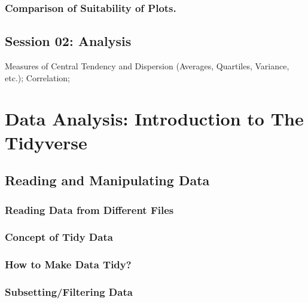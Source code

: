 \documentclass[
]{book}
\begin{document}
\hypertarget{comparison-of-suitability-of-plots.}{%
\subsection{Comparison of Suitability of Plots.}\label{comparison-of-suitability-of-plots.}}

\hypertarget{session-02-analysis}{%
\section{Session 02: Analysis}\label{session-02-analysis}}

Measures of Central Tendency and Dispersion (Averages, Quartiles, Variance, etc.); Correlation;

\hypertarget{tidy-1}{%
\chapter{Data Analysis: Introduction to The Tidyverse}\label{tidy-1}}

\hypertarget{reading-and-manipulating-data}{%
\section{Reading and Manipulating Data}\label{reading-and-manipulating-data}}

\hypertarget{reading-data-from-different-files}{%
\subsection{Reading Data from Different Files}\label{reading-data-from-different-files}}

\hypertarget{concept-of-tidy-data}{%
\subsection{Concept of Tidy Data}\label{concept-of-tidy-data}}

\hypertarget{how-to-make-data-tidy}{%
\subsection{How to Make Data Tidy?}\label{how-to-make-data-tidy}}

\hypertarget{subsettingfiltering-data}{%
\subsection{Subsetting/Filtering Data}\label{subsettingfiltering-data}}
\end{document}
